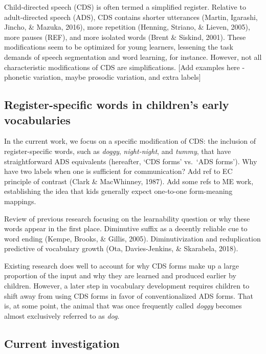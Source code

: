 \documentclass[10pt, letterpaper]{article}
\begin{document}
Child-directed speech (CDS) is often termed a simplified register.
Relative to adult-directed speech (ADS), CDS contains shorter utterances
(Martin, Igarashi, Jincho, \& Mazuka, 2016), more repetition (Henning,
Striano, \& Lieven, 2005), more pauses (REF), and more isolated words
(Brent \& Siskind, 2001). These modifications seem to be optimized for
young learners, lessening the task demands of speech segmentation and
word learning, for instance. However, not all characteristic
modifications of CDS are simplifications. {[}Add examples here -
phonetic variation, maybe prosodic variation, and extra labels{]}

\hypertarget{register-specific-words-in-childrens-early-vocabularies}{%
\subsection{Register-specific words in children's early
vocabularies}\label{register-specific-words-in-childrens-early-vocabularies}}

In the current work, we focus on a specific modification of CDS: the
inclusion of register-specific words, such as \emph{doggy},
\emph{night-night}, and \emph{tummy}, that have straightforward ADS
equivalents (hereafter, `CDS forms' vs.~`ADS forms'). Why have two
labels when one is sufficient for communication? Add ref to EC principle
of contrast (Clark \& MacWhinney, 1987). Add some refs to ME work,
establishing the idea that kids generally expect one-to-one form-meaning
mappings.

Review of previous research focusing on the learnability question or why
these words appear in the first place. Diminutive suffix as a decently
reliable cue to word ending (Kempe, Brooks, \& Gillis, 2005).
Diminutivization and reduplication predictive of vocabulary growth (Ota,
Davies-Jenkins, \& Skarabela, 2018).

Existing research does well to account for why CDS forms make up a large
proportion of the input and why they are learned and produced earlier by
children. However, a later step in vocabulary development requires
children to shift away from using CDS forms in favor of conventionalized
ADS forms. That is, at some point, the animal that was once frequently
called \emph{doggy} becomes almost exclusively referred to as
\emph{dog}.

\hypertarget{current-investigation}{%
\subsection{Current investigation}\label{current-investigation}}
\end{document}
